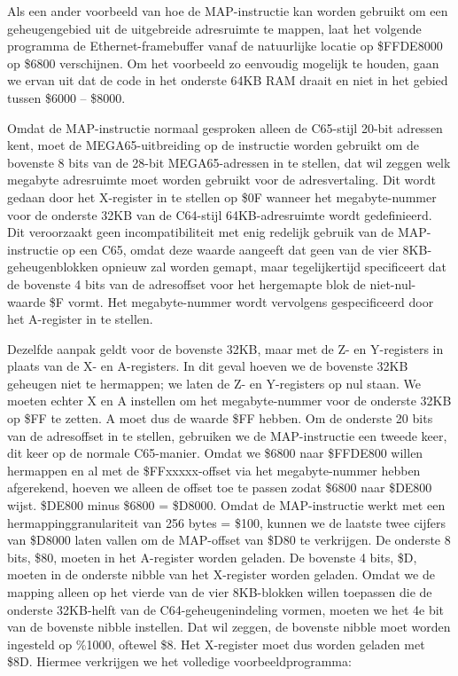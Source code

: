 Als een ander voorbeeld van hoe de MAP-instructie kan worden gebruikt om een geheugengebied uit de uitgebreide adresruimte te mappen, laat het volgende programma de Ethernet-framebuffer vanaf de natuurlijke locatie op \$FFDE8000 op \$6800 verschijnen. Om het voorbeeld zo eenvoudig mogelijk te houden, gaan we ervan uit dat de code in het onderste 64KB RAM draait en niet in het gebied tussen \$6000 -- \$8000.

Omdat de MAP-instructie normaal gesproken alleen de C65-stijl 20-bit adressen kent, moet de MEGA65-uitbreiding op de instructie worden gebruikt om de bovenste 8 bits van de 28-bit MEGA65-adressen in te stellen, dat wil zeggen welk megabyte adresruimte moet worden gebruikt voor de adresvertaling. Dit wordt gedaan door het X-register in te stellen op \$0F wanneer het megabyte-nummer voor de onderste 32KB van de C64-stijl 64KB-adresruimte wordt gedefinieerd. Dit veroorzaakt geen incompatibiliteit met enig redelijk gebruik van de MAP-instructie op een C65, omdat deze waarde aangeeft dat geen van de vier 8KB-geheugenblokken opnieuw zal worden gemapt, maar tegelijkertijd specificeert dat de bovenste 4 bits van de adresoffset voor het hergemapte blok de niet-nul-waarde \$F vormt. Het megabyte-nummer wordt vervolgens gespecificeerd door het A-register in te stellen.

Dezelfde aanpak geldt voor de bovenste 32KB, maar met de Z- en Y-registers in plaats van de X- en A-registers. In dit geval hoeven we de bovenste 32KB geheugen niet te hermappen; we laten de Z- en Y-registers op nul staan. We moeten echter X en A instellen om het megabyte-nummer voor de onderste 32KB op \$FF te zetten. A moet dus de waarde \$FF hebben. Om de onderste 20 bits van de adresoffset in te stellen, gebruiken we de MAP-instructie een tweede keer, dit keer op de normale C65-manier. Omdat we \$6800 naar \$FFDE800 willen hermappen en al met de \$FFxxxxx-offset via het megabyte-nummer hebben afgerekend, hoeven we alleen de offset toe te passen zodat \$6800 naar \$DE800 wijst. \$DE800 minus \$6800 = \$D8000. Omdat de MAP-instructie werkt met een hermappinggranulariteit van 256 bytes = \$100, kunnen we de laatste twee cijfers van \$D8000 laten vallen om de MAP-offset van \$D80 te verkrijgen. De onderste 8 bits, \$80, moeten in het A-register worden geladen. De bovenste 4 bits, \$D, moeten in de onderste nibble van het X-register worden geladen. Omdat we de mapping alleen op het vierde van de vier 8KB-blokken willen toepassen die de onderste 32KB-helft van de C64-geheugenindeling vormen, moeten we het 4e bit van de bovenste nibble instellen. Dat wil zeggen, de bovenste nibble moet worden ingesteld op \%1000, oftewel \$8. Het X-register moet dus worden geladen met \$8D. Hiermee verkrijgen we het volledige voorbeeldprogramma:

